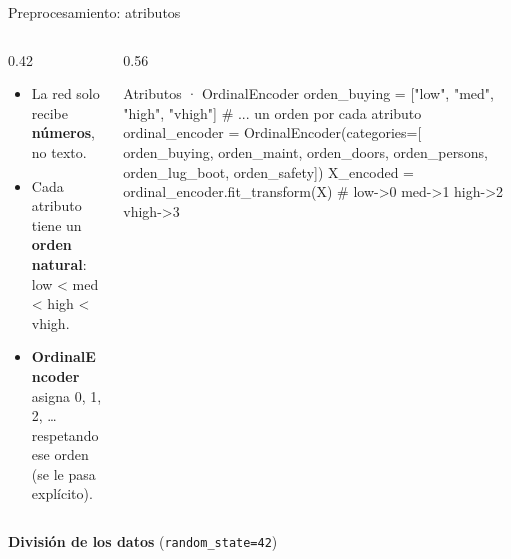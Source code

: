 \documentclass[10pt,aspectratio=169]{beamer}
\begin{document}
\begin{frame}[fragile]{Preprocesamiento: atributos}
  \begin{columns}[c]
    \begin{column}{0.42\textwidth}
      \small
      \begin{itemize}
        \setlength{\itemsep}{0.5em}
        \item La red solo recibe \textbf{números}, no texto.
        \item Cada atributo tiene un \textbf{orden natural}:
              low < med < high < vhigh.
        \item \textbf{OrdinalEncoder} asigna 0, 1, 2, \dots{} respetando
              ese orden (se le pasa explícito).
      \end{itemize}
    \end{column}
    \begin{column}{0.56\textwidth}
\begin{codigo}{Atributos · OrdinalEncoder}
orden_buying = ["low", "med", "high", "vhigh"]
# ... un orden por cada atributo
ordinal_encoder = OrdinalEncoder(categories=[
    orden_buying, orden_maint, orden_doors,
    orden_persons, orden_lug_boot, orden_safety])
X_encoded = ordinal_encoder.fit_transform(X)
# low->0  med->1  high->2  vhigh->3
\end{codigo}
    \end{column}
  \end{columns}

  \vspace{1.2em}
  \textbf{División de los datos} {\small(\texttt{random\_state=42})}
  \vspace{0.6em}

  \centering
\end{frame}
\end{document}
